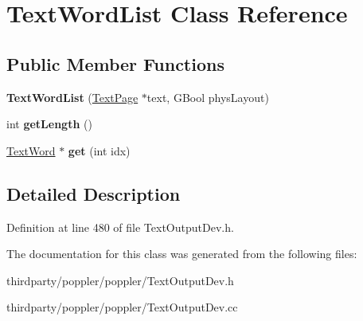 \hypertarget{class_text_word_list}{}\section{Text\+Word\+List Class Reference}
\label{class_text_word_list}
\subsection*{Public Member Functions}
\begin{DoxyCompactItemize}
\item 
\mbox{\label{class_text_word_list_aeff9d76341098decaa5fdbfbe63c860f}} 
{\bfseries Text\+Word\+List} (\hyperlink{class_text_page}{Text\+Page} $\ast$text, G\+Bool phys\+Layout)
\item 
\mbox{\label{class_text_word_list_a7a710cd61d4521e8a5e7489ea2dbb337}} 
int {\bfseries get\+Length} ()
\item 
\mbox{\label{class_text_word_list_ab84636d57e58b486fb493e87a8f55879}} 
\hyperlink{class_text_word}{Text\+Word} $\ast$ {\bfseries get} (int idx)
\end{DoxyCompactItemize}


\subsection{Detailed Description}


Definition at line 480 of file Text\+Output\+Dev.\+h.



The documentation for this class was generated from the following files\+:\begin{DoxyCompactItemize}
\item 
thirdparty/poppler/poppler/Text\+Output\+Dev.\+h\item 
thirdparty/poppler/poppler/Text\+Output\+Dev.\+cc\end{DoxyCompactItemize}
